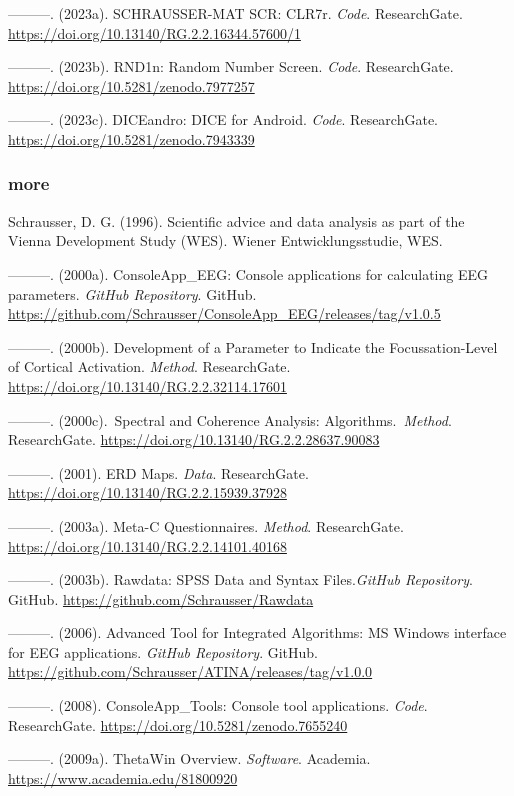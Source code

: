 \documentclass[
]{article}
\begin{document}
---------. (2023a). SCHRAUSSER-MAT SCR: CLR7r. \emph{Code}.
ResearchGate. \url{https://doi.org/10.13140/RG.2.2.16344.57600/1}

---------. (2023b). RND1n: Random Number Screen. \emph{Code}.
ResearchGate. \url{https://doi.org/10.5281/zenodo.7977257}

---------. (2023c). DICEandro: DICE for Android. \emph{Code}.
ResearchGate. \url{https://doi.org/10.5281/zenodo.7943339}

\hypertarget{more}{%
\subsubsection{more}\label{more}}

Schrausser, D. G. (1996). Scientific advice and data analysis as part of
the Vienna Development Study (WES). Wiener Entwicklungsstudie, WES.

---------. (2000a). ConsoleApp\_EEG: Console applications for
calculating EEG parameters. \emph{GitHub Repository}. GitHub.
\url{https://github.com/Schrausser/ConsoleApp_EEG/releases/tag/v1.0.5}

---------. (2000b). Development of a Parameter to Indicate the
Focussation-Level of Cortical Activation. \emph{Method}. ResearchGate.
\url{https://doi.org/10.13140/RG.2.2.32114.17601}

---------. (2000c).~Spectral and Coherence Analysis:
Algorithms.~\emph{Method}. ResearchGate.
\url{https://doi.org/10.13140/RG.2.2.28637.90083}

---------. (2001). ERD Maps. \emph{Data}. ResearchGate.
\url{https://doi.org/10.13140/RG.2.2.15939.37928}

---------. (2003a). Meta-C Questionnaires. \emph{Method}. ResearchGate.
\url{https://doi.org/10.13140/RG.2.2.14101.40168}

---------. (2003b). Rawdata: SPSS Data and Syntax Files.\emph{GitHub
Repository}. GitHub. \url{https://github.com/Schrausser/Rawdata}

---------. (2006). Advanced Tool for Integrated Algorithms: MS Windows
interface for EEG applications. \emph{GitHub Repository}. GitHub.
\url{https://github.com/Schrausser/ATINA/releases/tag/v1.0.0}

---------. (2008). ConsoleApp\_Tools: Console tool applications.
\emph{Code}. ResearchGate. \url{https://doi.org/10.5281/zenodo.7655240}

---------. (2009a). ThetaWin Overview. \emph{Software}. Academia.
\url{https://www.academia.edu/81800920}
\end{document}
